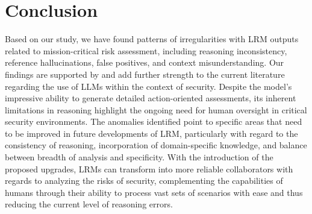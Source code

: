 \documentclass[sigconf]{acmart}
\begin{document}
\section{Conclusion}
Based on our study, we have found patterns of irregularities with LRM outputs related to mission-critical risk assessment, including reasoning inconsistency, reference hallucinations, false positives, and context misunderstanding. Our findings are supported by and add further strength to the current literature regarding the use of LLMs within the context of security. Despite the model's impressive ability to generate detailed action-oriented assessments, its inherent limitations in reasoning highlight the ongoing need for human oversight in critical security environments. The anomalies identified point to specific areas that need to be improved in future developments of LRM, particularly with regard to the consistency of reasoning, incorporation of domain-specific knowledge, and balance between breadth of analysis and specificity. With the introduction of the proposed upgrades, LRMs can transform into more reliable collaborators with regards to analyzing the risks of security, complementing the capabilities of humans through their ability to process vast sets of scenarios with ease and thus reducing the current level of reasoning errors.


\appendix
\end{document}

